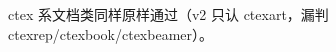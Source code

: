 \documentclass[UTF8]{ctexrep}
\begin{document}
ctex 系文档类同样原样通过（v2 只认 ctexart，漏判 ctexrep/ctexbook/ctexbeamer）。
\end{document}
